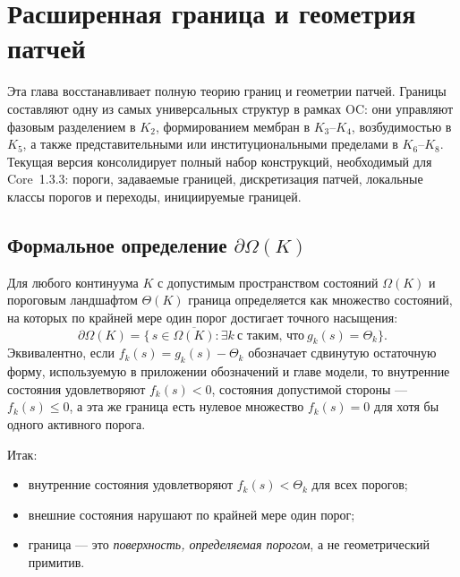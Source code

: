 
\section{Расширенная граница и геометрия патчей}
\label{sec:boundary-extended}

Эта глава восстанавливает полную теорию границ и геометрии патчей.
Границы составляют одну из самых универсальных структур в рамках OC:
они управляют фазовым разделением в \(K_2\), формированием мембран в \(K_3\)--\(K_4\),
возбудимостью в \(K_5\), а также представительными или институциональными пределами в
\(K_6\)--\(K_8\).
Текущая версия консолидирует полный набор конструкций, необходимый для Core~1.3.3:
пороги, задаваемые границей, дискретизация патчей, локальные классы порогов
и переходы, инициируемые границей.

\subsection{Формальное определение \texorpdfstring{$\partial\Omega(K)$}{границы}}

Для любого континуума \(K\) с допустимым пространством состояний \(\Omega(K)\) и
пороговым ландшафтом \(\Theta(K)\) граница определяется как множество состояний, на которых
по крайней мере один порог достигает точного насыщения:
\[
  \partial\Omega(K)
  =
  \big\{\, s \in \overline{\Omega(K)} :
          \exists k\ \text{с таким, что}\ g_k(s) = \Theta_k \big\}.
\]
Эквивалентно, если \(f_k(s)=g_k(s)-\Theta_k\) обозначает сдвинутую остаточную форму,
используемую в приложении обозначений и главе модели, то внутренние состояния
удовлетворяют \(f_k(s)<0\), состояния допустимой стороны — \(f_k(s)\le0\),
а эта же граница есть нулевое множество \(f_k(s)=0\) для хотя бы одного
активного порога.

Итак:
\begin{itemize}
    \item внутренние состояния удовлетворяют \(f_k(s) < \Theta_k\) для всех порогов;
    \item внешние состояния нарушают по крайней мере один порог;
    \item граница — это \emph{поверхность, определяемая порогом}, а не геометрический
          примитив.
\end{itemize}

